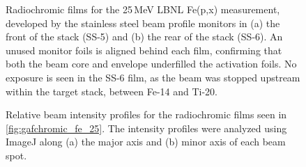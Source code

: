 % 
\begin{figure}
    \centering
    \caption{ Radiochromic films for the 25\,MeV LBNL Fe(p,x) measurement, developed by the stainless steel beam profile monitors in (a) the front of the stack (SS-5) and (b) the rear of the stack (SS-6). An unused  monitor foils is aligned behind each film, confirming that both the beam core and envelope underfilled the activation foils. No exposure is seen in the SS-6 film, as the beam was stopped upstream within the target stack, between Fe-14 and Ti-20.}
     \label{fig:gafchromic_fe_25}
\end{figure}




\begin{figure}
    \centering
    \caption{ Relative beam intensity profiles for the radiochromic films seen in \autoref{fig:gafchromic_fe_25}. The intensity profiles were analyzed using ImageJ along (a) the major axis and (b) minor axis of each beam spot. }
     \label{fig:gafchromic_fe_profiles_25}
\end{figure}




